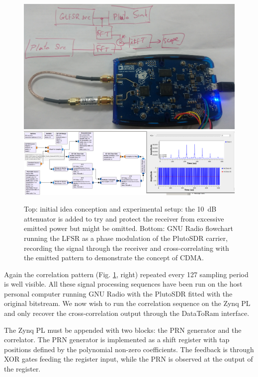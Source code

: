 \documentclass{article}
\begin{document}
\begin{figure}[h!tb]
\includegraphics[width=\linewidth]{DSC_0275.JPG}
\includegraphics[width=\linewidth]{xcorr_pluto2.png}
\caption{Top: initial idea conception and experimental setup: the 10~dB attenuator
is added to try and protect the receiver from excessive emitted power but might
be omitted. Bottom: GNU Radio flowchart running the LFSR as a phase modulation of the
PlutoSDR carrier, recording the signal through the receiver and cross-correlating with
the emitted pattern to demonstrate the concept of CDMA.}
\label{f1}
\end{figure}

Again the correlation pattern (Fig. \ref{f1}, right) repeated every 127 sampling period is well visible. All these
signal processing sequences have been run on the host personal computer running GNU Radio with the PlutoSDR
fitted with the original bitstream. We now wish to run the correlation sequence on the Zynq PL and only recover
the cross-correlation output through the DataToRam interface.

The Zynq PL must be appended with two blocks: the PRN generator and the correlator. The PRN generator is
implemented as a shift register with tap positions defined by the polynomial non-zero coefficients. The feedback
is through XOR gates feeding the register input, while the PRN is observed at the output of the register.
\end{document}
